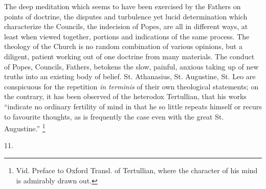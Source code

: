 The deep meditation which seems to have been exercised
by the Fathers on points of doctrine, the disputes and
turbulence yet lucid determination which characterize the
Councils, the indecision of Popes, are all in different
ways, at least when viewed together, portions and
indications of the same process. The theology of the
Church is no random combination of various opinions, but
a diligent, patient working out of one doctrine from many
materials. The conduct of Popes, Councils, Fathers,
betokens the slow, painful, anxious taking up of new
truths into an existing body of belief. St. Athanasius,
St. Augustine, St. Leo are conspicuous for the repetition
\emph{in terminis} of their own theological statements;
on the contrary, it has been observed of the heterodox
Tertullian, that his works ``indicate no ordinary
fertility of mind in that he so little repeats himself or
recurs to favourite thoughts, as is frequently the case
even with the great St. Augustine.'' \footnote{Vid. Preface to Oxford Transl.
of Tertullian, where the character of his mind is
admirably drawn out.}

11.

